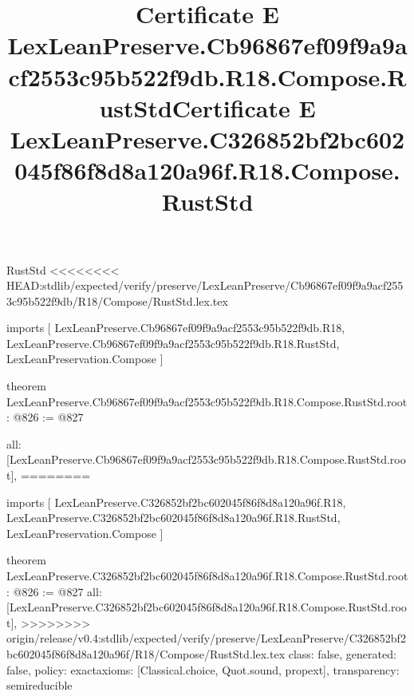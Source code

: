 \begin{lexlean}{RustStd}
<<<<<<<< HEAD:stdlib/expected/verify/preserve/LexLeanPreserve/Cb96867ef09f9a9acf2553c95b522f9db/R18/Compose/RustStd.lex.tex
\title{Certificate E LexLeanPreserve.Cb96867ef09f9a9acf2553c95b522f9db.R18.Compose.RustStd}
\begin{coremodule}
imports [
  LexLeanPreserve.Cb96867ef09f9a9acf2553c95b522f9db.R18,
  LexLeanPreserve.Cb96867ef09f9a9acf2553c95b522f9db.R18.RustStd,
  LexLeanPreservation.Compose
]

theorem LexLeanPreserve.Cb96867ef09f9a9acf2553c95b522f9db.R18.Compose.RustStd.root : @826 := @827 {
  all: [LexLeanPreserve.Cb96867ef09f9a9acf2553c95b522f9db.R18.Compose.RustStd.root],
========
\title{Certificate E LexLeanPreserve.C326852bf2bc602045f86f8d8a120a96f.R18.Compose.RustStd}
\begin{coremodule}
imports [
  LexLeanPreserve.C326852bf2bc602045f86f8d8a120a96f.R18,
  LexLeanPreserve.C326852bf2bc602045f86f8d8a120a96f.R18.RustStd,
  LexLeanPreservation.Compose
]

theorem LexLeanPreserve.C326852bf2bc602045f86f8d8a120a96f.R18.Compose.RustStd.root : @826 := @827 {
  all: [LexLeanPreserve.C326852bf2bc602045f86f8d8a120a96f.R18.Compose.RustStd.root],
>>>>>>>> origin/release/v0.4:stdlib/expected/verify/preserve/LexLeanPreserve/C326852bf2bc602045f86f8d8a120a96f/R18/Compose/RustStd.lex.tex
  class: false,
  generated: false,
  policy: exact{axioms: [Classical.choice, Quot.sound, propext]},
  transparency: semireducible
}


\end{coremodule}}
\end{coremodule}
\end{lexlean}
